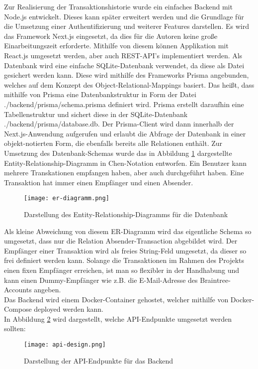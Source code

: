 Zur Realisierung der Transaktionshistorie wurde ein einfaches Backend mit Node.js entwickelt.
Dieses kann später erweitert werden und die Grundlage für die Umsetzung einer Authentifizierung und weiterer Features darstellen.
Es wird das Framework Next.js eingesetzt, da dies für die Autoren keine große Einarbeitungszeit erforderte.
Mithilfe von diesem können Applikation mit React.js umgesetzt werden, aber auch REST-API's implementiert werden.
Als Datenbank wird eine einfache SQLite-Datenbank verwendet, da diese als Datei gesichert werden kann.
Diese wird mithilfe des Frameworks Prisma angebunden, welches auf dem Konzept des Object-Relational-Mappings basiert.
Das heißt, dass mithilfe von Prisma eine Datenbankstruktur in Form der Datei ./backend/prisma/schema.prisma definiert wird.
Prisma erstellt daraufhin eine Tabellenstruktur und sichert diese in der SQLite-Datenbank ./backend/prisma/database.db.
Der Prisma-Client wird dann innerhalb der Next.js-Anwendung aufgerufen und erlaubt die Abfrage der Datenbank in einer objekt-notierten Form, die ebenfalls bereits alle Relationen enthält.
Zur Umsetzung des Datenbank-Schemas wurde das in Abbildung \ref{fig:er_diagramm} dargestellte Entity-Relationship-Diagramm in Chen-Notation entworfen.
Ein Benutzer kann mehrere Transkationen empfangen haben, aber auch durchgeführt haben.
Eine Transaktion hat immer einen Empfänger und einen Absender.

\begin{figure}[H]
  \centering
  \texttt{[image: er-diagramm.png]}
  \label{fig:er_diagramm}
  \caption{Darstellung des Entity-Relationship-Diagramms für die Datenbank}
\end{figure}

Als kleine Abweichung von diesem ER-Diagramm wird das eigentliche Schema so umgesetzt, dass nur die Relation Absender-Transaction abgebildet wird.
Der Empfänger einer Transaktion wird als freies String-Feld umgesetzt, da dieser so frei definiert werden kann.
Solange die Transaktionen im Rahmen des Projekts einen fixen Empfänger erreichen, ist man so flexibler in der Handhabung und kann einen Dummy-Empfänger wie z.B. die E-Mail-Adresse des Braintree-Accounts angeben.
\\
Das Backend wird einem Docker-Container gehostet, welcher mithilfe von Docker-Compose deployed werden kann.
\\
In Abbildung \ref{fig:apidesign} wird dargestellt, welche API-Endpunkte umgesetzt werden sollten:

\begin{figure}[H]
  \centering
  \texttt{[image: api-design.png]}
  \label{fig:apidesign}
  \caption{Darstellung der API-Endpunkte für das Backend}
\end{figure}

